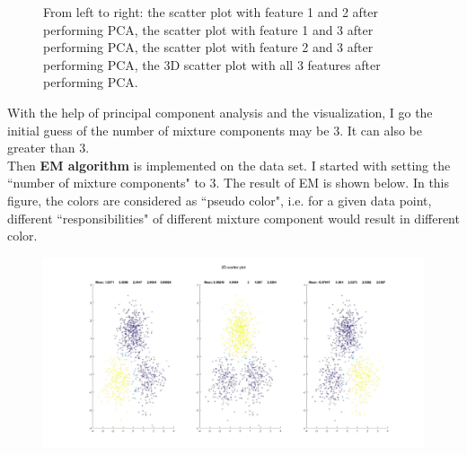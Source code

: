 \documentclass[a4paper]{article}
\begin{document}
\begin{spacing}{2.0}
\begin{enumerate}[(1)]
\begin{figure}[H]
\caption{From left to right: the scatter plot with feature 1 and 2 after performing PCA, the scatter plot with feature 1 and 3 after performing PCA, the scatter plot with feature 2 and 3 after performing PCA, the 3D scatter plot with all 3 features after performing PCA.}
\end{figure}
With the help of principal component analysis and the visualization, I go the initial guess of the number of mixture components may be 3. It can also be greater than 3.\\
Then \textbf{EM algorithm} is implemented on the data set. I started with setting the ``number of mixture components" to 3. The result of EM is shown below. In this figure, the colors are considered as ``pseudo color", i.e. for a given data point, different ``responsibilities" of different mixture component would result in different color.
\begin{figure}[H]
\centering
\includegraphics[width = 6in]{scatter2d.jpg}
\end{figure}


\end{enumerate}
\end{spacing}
\end{document}
